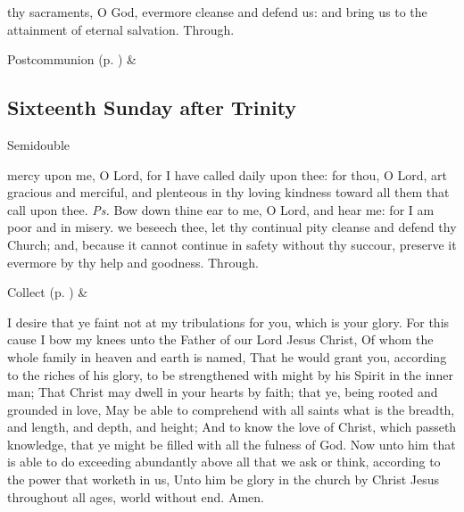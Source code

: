 
\vspace{-0.25\baselineskip}

\postcommunion

\vspace{-0.1\baselineskip}

 thy sacraments, O God, evermore cleanse and defend us: and bring us to the attainment of eternal salvation. Through.


\begin{rubric}
     Postcommunion  (p. \pageref{SPSaints}) \&  
\end{rubric}


\clearpage
\subsection{Sixteenth Sunday after Trinity}
\begin{inhead}
{Semidouble}
\end{inhead}


\introit
{} mercy upon me, O Lord, for I have called daily upon thee: for thou, O Lord, art gracious and merciful, and plenteous in thy loving kindness toward all them that call upon thee. \textit{Ps.} Bow down thine ear to me, O Lord, and hear me: for I am poor and in misery.
\collect
{} we beseech thee, let thy continual pity cleanse and defend thy Church; and, because it cannot continue in safety without thy succour, preserve it evermore by thy help and goodness. Through.
\begin{rubric}
     Collect  (p. \pageref{SPSaints}) \&  
\end{rubric}

 I desire that ye faint not at my tribulations for you, which is your glory. For this cause I bow my knees unto the Father of our Lord Jesus Christ, Of whom the whole family in heaven and earth is named, That he would grant you, according to the riches of his glory, to be strengthened with might by his Spirit in the inner man; That Christ may dwell in your hearts by faith; that ye, being rooted and grounded in love, May be able to comprehend with all saints what is the breadth, and length, and depth, and height; And to know the love of Christ, which passeth knowledge, that ye might be filled with all the fulness of God. Now unto him that is able to do exceeding abundantly above all that we ask or think, according to the power that worketh in us, Unto him be glory in the church by Christ Jesus throughout all ages, world without end. Amen.

